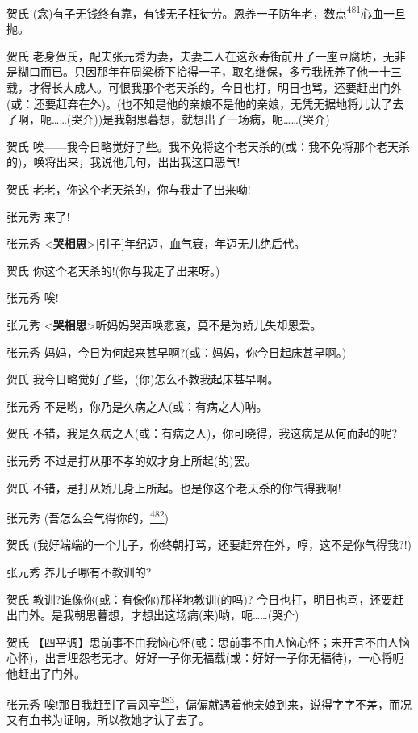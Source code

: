 贺氏
(念)有子无钱终有靠，有钱无子枉徒劳。恩养一子防年老，数点\protect\hyperlink{fn481}{\textsuperscript{481}}心血一旦抛。

贺氏
老身贺氏，配夫张元秀为妻，夫妻二人在这永寿街前开了一座豆腐坊，无非是糊口而已。只因那年在周梁桥下拾得一子，取名继保，多亏我抚养了他一十三载，才得长大成人。可恨我那个老天杀的，今日也打，明日也骂，还要赶出门外(或：还要赶奔在外)。(也不知是他的亲娘不是他的亲娘，无凭无据地将儿认了去了啊，呃\ldots{}\ldots{}(哭介))是我朝思暮想，就想出了一场病，呃\ldots{}\ldots{}(哭介)

贺氏
唉------我今日略觉好了些。我不免将这个老天杀的(或：我不免将那个老天杀的)，唤将出来，我说他几句，出出我这口恶气!

贺氏 老老，你这个老天杀的，你与我走了出来呦!

张元秀 来了!

张元秀
\textless{}\textbf{哭相思}\textgreater{}{[}引子{]}年纪迈，血气衰，年迈无儿绝后代。

贺氏 你这个老天杀的!(你与我走了出来呀。)

张元秀 唉!

张元秀
\textless{}\textbf{哭相思}\textgreater{}听妈妈哭声唤悲哀，莫不是为娇儿失却恩爱。

张元秀 妈妈，今日为何起来甚早啊?(或：妈妈，你今日起床甚早啊。)

贺氏 我今日略觉好了些，(你)怎么不教我起床甚早啊。

张元秀 不是哟，你乃是久病之人(或：有病之人)呐。

贺氏 不错，我是久病之人(或：有病之人)，你可晓得，我这病是从何而起的呢?

张元秀 不过是打从那不孝的奴才身上所起(的)罢。

贺氏 不错，是打从娇儿身上所起。也是你这个老天杀的你气得我啊!

张元秀
(吾怎么会气得你的，\protect\hyperlink{fn482}{\textsuperscript{482}})

贺氏
(我好端端的一个儿子，你终朝打骂，还要赶奔在外，哼，这不是你气得我?!)

张元秀 养儿子哪有不教训的?

贺氏 教训?谁像你(或：有像你)那样地教训(的吗)?
今日也打，明日也骂，还要赶出门外。是我朝思暮想，才想出这场病(来)哟，呃\ldots{}\ldots{}(哭介)

贺氏
【四平调】思前事不由我恼心怀(或：思前事不由人恼心怀；未开言不由人恼心怀)，出言埋怨老无才。好好一子你无福载(或：好好一子你无福待)，一心将呃他赶出了门外。

张元秀
唉!那日我赶到了青风亭\protect\hyperlink{fn483}{\textsuperscript{483}}，偏偏就遇着他亲娘到来，说得字字不差，而况又有血书为证呐，所以教她才认了去了。

